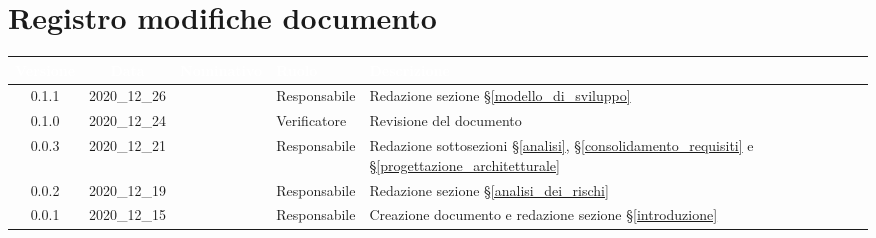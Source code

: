 \section*{Registro modifiche documento}
{

     
\renewcommand{\arraystretch}{1.5}
\centering
\begin{longtable}{ c c  C{2.3cm} C{3cm} C{3.2cm}}


 \textcolor{white}{\textbf{Versione}}&
    \textcolor{white}{\textbf{Data}}&
    \textcolor{white}{\textbf{Nominativo}}&
    \textcolor{white}{\textbf{Ruolo}}&
    \textcolor{white}{\textbf{Descrizione}}\\	
    \endhead

    0.1.1 & 2020\_12\_26 & \MM{} & Responsabile & Redazione sezione \S\ref{modello_di_sviluppo} \\

    0.1.0 & 2020\_12\_24 & \PC{} & Verificatore & Revisione del documento\\

    0.0.3 & 2020\_12\_21 & \MM{} & Responsabile & Redazione sottosezioni \S\ref{analisi}, \S\ref{consolidamento_requisiti} e \S\ref{progettazione_architetturale} \\

    0.0.2 & 2020\_12\_19 & \MM{} & Responsabile & Redazione sezione \S\ref{analisi_dei_rischi}\\

    0.0.1 & 2020\_12\_15 & \MM{} & Responsabile & Creazione documento e redazione sezione \S\ref{introduzione}
			
\end{longtable}
}